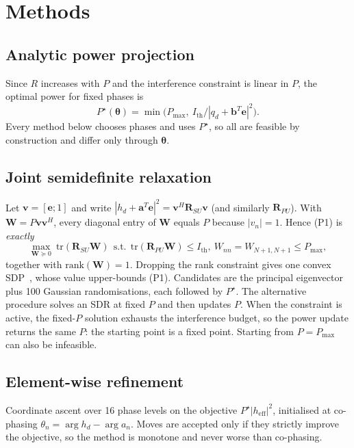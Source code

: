 \documentclass[conference]{IEEEtran}
\newcommand{\e}{\mathbf{e}}
\newcommand{\Ith}{I_{\mathrm{th}}}
\newcommand{\Pmax}{P_{\max}}
\begin{document}
\section{Methods}
\subsection{Analytic power projection}
Since $R$ increases with $P$ and the interference constraint is linear in $P$, the optimal power for fixed phases is
\begin{equation}
P^\star(\bm\theta)=\min\!\big(\Pmax,\ \Ith/|q_d+\mathbf{b}^T\e|^2\big).
\end{equation}
Every method below chooses phases and uses $P^\star$, so all are feasible by construction and differ only through $\bm\theta$.

\subsection{Joint semidefinite relaxation}
Let $\mathbf{v}=[\e;1]$ and write $|h_d+\mathbf{a}^T\e|^2=\mathbf{v}^H\mathbf{R}_{SU}\mathbf{v}$ (and similarly $\mathbf{R}_{PU}$). With $\mathbf{W}=P\mathbf{v}\mathbf{v}^H$, every diagonal entry of $\mathbf{W}$ equals $P$ because $|v_n|=1$. Hence (P1) is \emph{exactly}
\begin{equation}
\max_{\mathbf{W}\succeq 0}\ \mathrm{tr}(\mathbf{R}_{SU}\mathbf{W})\ \ \text{s.t.}\ \ \mathrm{tr}(\mathbf{R}_{PU}\mathbf{W})\le \Ith,\ W_{nn}=W_{N+1,N+1}\le \Pmax,
\end{equation}
together with $\mathrm{rank}(\mathbf{W})=1$. Dropping the rank constraint gives one convex SDP~\cite{luo2010}, whose value upper-bounds (P1). Candidates are the principal eigenvector plus 100 Gaussian randomisations, each followed by $P^\star$. The alternative procedure solves an SDR at fixed $P$ and then updates $P$. When the constraint is active, the fixed-$P$ solution exhausts the interference budget, so the power update returns the same $P$: the starting point is a fixed point. Starting from $P=\Pmax$ can also be infeasible.

\subsection{Element-wise refinement}
Coordinate ascent over 16 phase levels on the objective $P^\star|h_\text{eff}|^2$, initialised at co-phasing $\theta_n=\arg h_d-\arg a_n$. Moves are accepted only if they strictly improve the objective, so the method is monotone and never worse than co-phasing.
\end{document}
